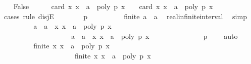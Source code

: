 \begin{isabellebody}
\ \ \isamarkupfalse%
\ False\isanewline
\ \ \ \ \isamarkupfalse%
\ {\isachardoublequoteopen}card\ {\isacharbraceleft}x{\isachardot}\ x\ {\isacharless}\ a\ {\isasymand}\ poly\ p\ x\ {\isacharequal}\ {}{\isacharbraceright}\ {\isacharequal}\ card\ {\isacharbraceleft}x{\isachardot}\ x\ {\isasymle}\ a\ {\isasymand}\ poly\ p\ x\ {\isacharequal}\ {}{\isacharbraceright}{\isachardoublequoteclose}\isanewline
\ \ \ \ \isamarkupfalse%
\ {\isacharparenleft}cases\ rule{\isacharcolon}\ disjE{\isacharparenright}\isanewline
\ \ \ \ \ \ \isamarkupfalse%
\ {\isachardoublequoteopen}p\ {\isacharequal}\ {}{\isachardoublequoteclose}\isanewline
\ \ \ \ \ \ \isamarkupfalse%
\ {\isachardoublequoteopen}{\isasymnot}finite\ {\isacharbraceleft}a\ {\isacharminus}\ {}{\isacharless}{\isachardot}{\isachardot}{\isacharless}a{\isacharbraceright}{\isachardoublequoteclose}\ \isamarkupfalse%
\ real{\isacharunderscore}infinite{\isacharunderscore}interval\ \isamarkupfalse%
\ simp\isanewline
\ \ \ \ \ \ \isamarkupfalse%
\ \isamarkupfalse%
\ {\isachardoublequoteopen}{\isacharbraceleft}a\ {\isacharminus}\ {}{\isacharless}{\isachardot}{\isachardot}{\isacharless}a{\isacharbraceright}\ {\isasymsubseteq}\ {\isacharbraceleft}x{\isachardot}\ x\ {\isasymle}\ a\ {\isasymand}\ poly\ p\ x\ {\isacharequal}\ {}{\isacharbraceright}{\isachardoublequoteclose}\isanewline
\ \ \ \ \ \ \ \ \ \ \ \ \ \ \ \ \ \ \ \ {\isachardoublequoteopen}{\isacharbraceleft}a\ {\isacharminus}\ {}{\isacharless}{\isachardot}{\isachardot}{\isacharless}a{\isacharbraceright}\ {\isasymsubseteq}\ {\isacharbraceleft}x{\isachardot}\ x\ {\isacharless}\ a\ {\isasymand}\ poly\ p\ x\ {\isacharequal}\ {}{\isacharbraceright}{\isachardoublequoteclose}\ \isanewline
\ \ \ \ \ \ \ \ \ \ \isamarkupfalse%
\ {\isacharbackquoteopen}p\ {\isacharequal}\ {}{\isacharbackquoteclose}\ \isamarkupfalse%
\ auto\isanewline
\ \ \ \ \ \ \isamarkupfalse%
\ \isamarkupfalse%
\ {\isachardoublequoteopen}{\isasymnot}finite\ {\isacharbraceleft}x{\isachardot}\ x\ {\isasymle}\ a\ {\isasymand}\ poly\ p\ x\ {\isacharequal}\ {}{\isacharbraceright}{\isachardoublequoteclose}\ \isanewline
\ \ \ \ \ \ \ \ \ \ \ \ \ \ \ \ \ \ \ \ \ {\isachardoublequoteopen}{\isasymnot}finite\ {\isacharbraceleft}x{\isachardot}\ x\ {\isacharless}\ a\ {\isasymand}\ poly\ p\ x\ {\isacharequal}\ {}{\isacharbraceright}{\isachardoublequoteclose}\ \isanewline

\end{isabellebody}
